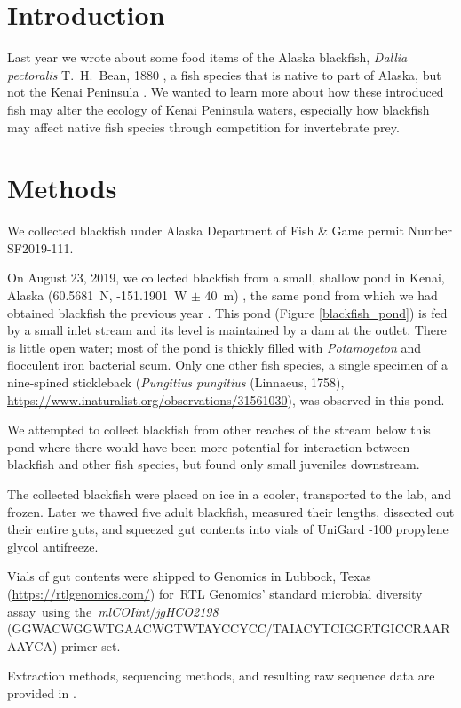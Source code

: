 \begin{multicols}{2}   

\section{Introduction}

Last year we  wrote about some food items of the Alaska blackfish, \textit{Dallia pectoralis} T.\ H.\ Bean, 1880 \citep{Bowseretal2019},  a fish species that is native to part of Alaska, but not the Kenai Peninsula \citep{Eidametal2016, Bowser2018}. We wanted to learn more about how these introduced fish may alter the ecology of Kenai Peninsula waters, especially how blackfish may affect native fish species through competition for invertebrate prey.

\section{Methods}

We collected blackfish under Alaska Department of Fish \& Game permit Number SF2019-111.

On August 23, 2019, we collected blackfish from a small, shallow pond in Kenai, Alaska (60.5681~\textdegree{}N, -151.1901~\textdegree{}W $\pm$ 40~m) \citep{bowser2019}, the same pond from which we had obtained blackfish the previous year \citep{Bowseretal2019}. This pond (Figure \ref{blackfish_pond}) is fed by a small inlet stream and its level is maintained by a dam at the outlet. There is little open water; most of the pond is thickly filled with \textit{Potamogeton} and flocculent iron bacterial scum. Only one other fish species, a single specimen of a nine-spined stickleback (\textit{Pungitius pungitius} (Linnaeus, 1758),  
\url{https://www.inaturalist.org/observations/31561030}), was observed in this pond.

We attempted to collect blackfish from other reaches of the stream below this pond where there would have been more potential for interaction between blackfish and other fish species, but found only small juveniles downstream. 

The collected blackfish were placed on ice in a cooler, transported to the lab, and frozen. Later we thawed five adult blackfish, measured their lengths, dissected out their entire guts, and squeezed gut contents into vials of UniGard -100 propylene glycol antifreeze.

Vials of gut contents were shipped to  Genomics in Lubbock, Texas (\url{https://rtlgenomics.com/}) for RTL Genomics' standard microbial diversity assay using the \textit{mlCOIint}/\textit{jgHCO2198} (GGWACWGGWTGAACWGTWTAYCCYCC/TAIACYTCIGGRTGICCRAARAAYCA) primer set.

Extraction methods, sequencing methods, and resulting raw sequence data are provided in \citet{BowserBowser2020}.

\end{multicols}
